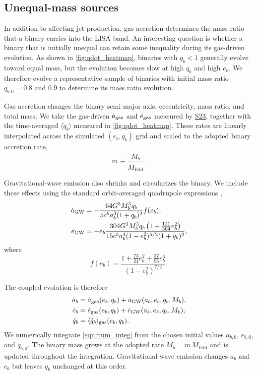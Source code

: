 \documentclass[fleqn,usenatbib]{mnras}
\newcommand{\Stwentythree}{\href{https://doi.org/10.1093/mnras/stac3263}{S23}\xspace}
\begin{document}
\subsection{Unequal-mass sources}\label{sec:unequal_mass}

In addition to affecting jet production, gas accretion determines the mass ratio that a binary carries into the LISA band. An interesting question is whether a binary that is initially unequal can retain some inequality during its gas-driven evolution. As shown in \autoref{fig:qdot_heatmap}, binaries with $q_b<1$ generally evolve toward equal mass, but the evolution becomes slow at high $q_b$ and high $e_b$. We therefore evolve a representative sample of binaries with initial mass ratio $q_{b,0}=0.8$ and $0.9$ to determine its mass ratio evolution.

Gas accretion changes the binary semi-major axis, eccentricity, mass ratio, and total mass. We take the gas-driven $\dot a_{\rm gas}$ and $\dot e_{\rm gas}$ measured by \Stwentythree, together with the time-averaged $\langle\dot q_b\rangle$ measured in \autoref{fig:qdot_heatmap}. These rates are linearly interpolated across the simulated $(e_b,q_b)$ grid and scaled to the adopted binary accretion rate,
\begin{equation}
\dot m \equiv \frac{\dot M_b}{\dot M_{\mathrm{Edd}}}.
\end{equation}

Gravitational-wave emission also shrinks and circularizes the binary. We include these effects using the standard orbit-averaged quadrupole expressions \citep{peters_64},
\begin{align}
\dot{a}_{\rm GW} &=
-\frac{64G^3M_b^3q_b}
{5c^5a_b^3(1+q_b)^2}
f(e_b),\\
\dot{e}_{\rm GW} &=
-e_b\frac{304G^3M_b^3q_b
\left(1+\frac{121}{304}e_b^2\right)}
{15c^5a_b^4(1-e_b^2)^{5/2}(1+q_b)^2},
\end{align}
where
\begin{equation}
f(e_b)=
\frac{1+\frac{73}{24}e_b^2+\frac{37}{96}e_b^4}
{(1-e_b^2)^{7/2}}.
\end{equation}

The coupled evolution is therefore
\begin{equation}
\begin{aligned}
\dot a_b &=
\dot a_{\rm gas}(e_b,q_b)
+\dot a_{\rm GW}(a_b,e_b,q_b,M_b),\\
\dot e_b &=
\dot e_{\rm gas}(e_b,q_b)
+\dot e_{\rm GW}(a_b,e_b,q_b,M_b),\\
\dot q_b &=
\langle\dot q_b\rangle_{\rm gas}(e_b,q_b).
\end{aligned}
\label{eqn:num_integ}
\end{equation}
We numerically integrate \autoref{eqn:num_integ} from the chosen initial values $a_{b,0}$, $e_{b,0}$, and $q_{b,0}$. The binary mass grows at the adopted rate $\dot M_b=\dot m \,\dot M_{\mathrm{Edd}}$ and is updated throughout the integration. Gravitational-wave emission changes $a_b$ and $e_b$ but leaves $q_b$ unchanged at this order.
\end{document}
